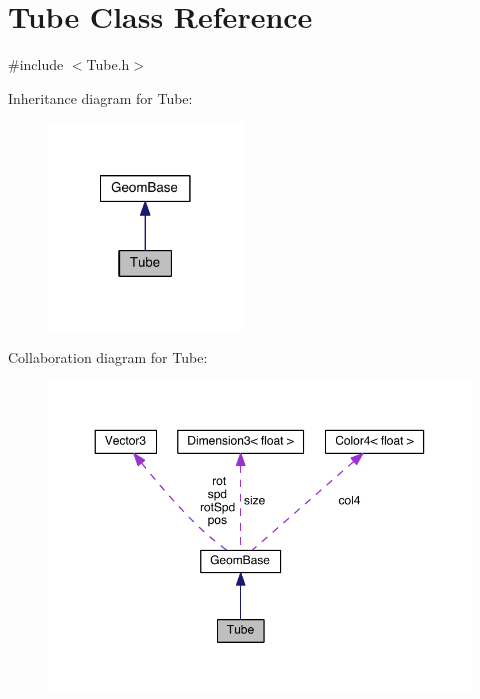 \hypertarget{class_tube}{\section{Tube Class Reference}
\label{class_tube}
}


{\ttfamily \#include $<$Tube.\-h$>$}



Inheritance diagram for Tube\-:
\nopagebreak
\begin{figure}[H]
\begin{center}
\leavevmode
\includegraphics[width=146pt]{class_tube__inherit__graph}
\end{center}
\end{figure}


Collaboration diagram for Tube\-:
\nopagebreak
\begin{figure}[H]
\begin{center}
\leavevmode
\includegraphics[width=350pt]{class_tube__coll__graph}
\end{center}
\end{figure}
